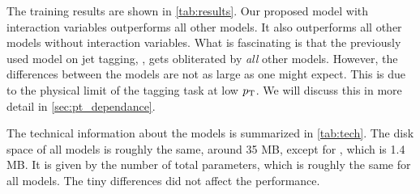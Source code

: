 The training results are shown in \cref{tab:results}. 
Our proposed \depart model with interaction variables outperforms all other models.
It also outperforms all other models without interaction variables.
What is fascinating is that the previously used model on jet tagging, \bdt, gets obliterated by \emph{all} other models.
However, the differences between the models are not as large as one might expect.
This is due to the physical limit of the tagging task at low $p_\text{T}$.
We will discuss this in more detail in \cref{sec:pt_dependance}.

The technical information about the models is summarized in \cref{tab:tech}.
The disk space of all models is roughly the same, around 35 MB, except for \bdt, which is 1.4 MB.
It is given by the number of total parameters, which is roughly the same for all models.
The tiny differences did not affect the performance.

